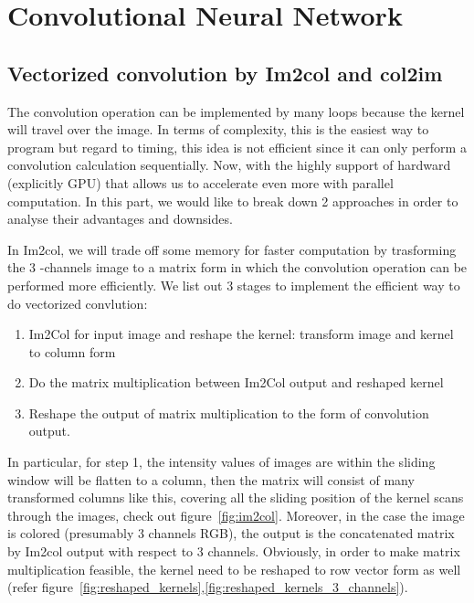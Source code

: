 \section{Convolutional Neural Network}
\subsection{Vectorized convolution by Im2col and col2im}
The convolution operation can be implemented by many loops because the kernel will travel over the image. In terms of complexity, this is the easiest way to program but regard to timing, this idea is not efficient since it can only perform a convolution calculation sequentially. Now, with the highly support of hardward (explicitly GPU) that allows us to accelerate even more with parallel computation. In this part, we would like to break down 2 approaches in order to analyse their advantages and downsides.\par

In Im2col, we will trade off some memory for faster computation by trasforming the 3 -channels image to a matrix form in which the convolution operation can be performed more efficiently. We list out 3 stages to implement the efficient way to do vectorized convlution:
\begin{enumerate}
    \item Im2Col for input image and reshape the kernel: transform image and kernel to column form
    \item Do the matrix multiplication between Im2Col output and reshaped kernel
    \item Reshape the output of matrix multiplication to the form of convolution output.
\end{enumerate}
In particular, for step 1, the intensity values of images are within the sliding window will be flatten to a column, then the matrix will consist of many transformed columns like this, covering all the sliding position of the kernel scans through the images, check out figure~\ref{fig:im2col}. Moreover, in the case the image is colored (presumably 3 channels RGB), the output is the concatenated matrix by Im2col output with respect to 3 channels. Obviously, in order to make matrix multiplication feasible, the kernel need to be reshaped to row vector form as well (refer figure~\ref{fig:reshaped_kernels},\ref{fig:reshaped_kernels_3_channels}).\par


